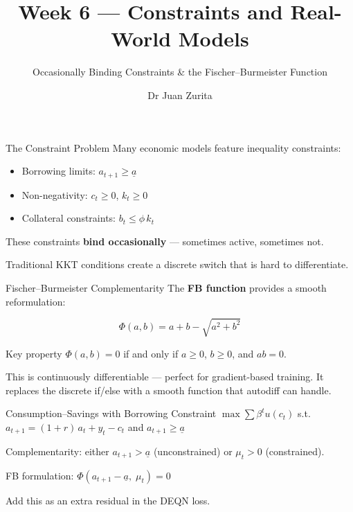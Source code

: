 \documentclass[aspectratio=169, 10pt]{beamer}
\title{Week 6 --- Constraints and Real-World Models}
\subtitle{Occasionally Binding Constraints \& the Fischer--Burmeister Function}
\author{Dr Juan Zurita}
\institute{Deep Learning for Macroeconomics\\
The University of Edinburgh~$\cdot$~School of Economics}
\date{}
\begin{document}
\maketitle

\begin{frame}{The Constraint Problem}
Many economic models feature \alert{inequality constraints}:

\bigskip
\begin{itemize}
\item Borrowing limits: $a_{t+1} \geq \underline{a}$
\item Non-negativity: $c_t \geq 0$, $k_t \geq 0$
\item Collateral constraints: $b_t \leq \phi\,k_t$
\end{itemize}

\bigskip
These constraints \textbf{bind occasionally} --- sometimes active, sometimes not.

Traditional KKT conditions create a discrete switch that is hard to differentiate.
\end{frame}

\begin{frame}{Fischer--Burmeister Complementarity}
The \textbf{FB function} provides a smooth reformulation:

$$\Phi(a, b) = a + b - \sqrt{a^2 + b^2}$$

\bigskip
\begin{block}{Key property}
$\Phi(a, b) = 0$ if and only if $a \geq 0$, $b \geq 0$, and $ab = 0$.
\end{block}

\bigskip
This is continuously differentiable --- perfect for gradient-based training. It replaces the discrete if/else with a smooth function that autodiff can handle.
\end{frame}

\begin{frame}{Consumption--Savings with Borrowing Constraint}
$\max \sum \beta^t u(c_t)$ s.t.\ $a_{t+1} = (1+r)\,a_t + y_t - c_t$ and $a_{t+1} \geq \underline{a}$

\bigskip
Complementarity: either $a_{t+1} > \underline{a}$ (unconstrained) or $\mu_t > 0$ (constrained).

\bigskip
FB formulation: $\Phi(a_{t+1} - \underline{a},\; \mu_t) = 0$

\bigskip
Add this as an extra residual in the DEQN loss.
\end{frame}
\end{document}
